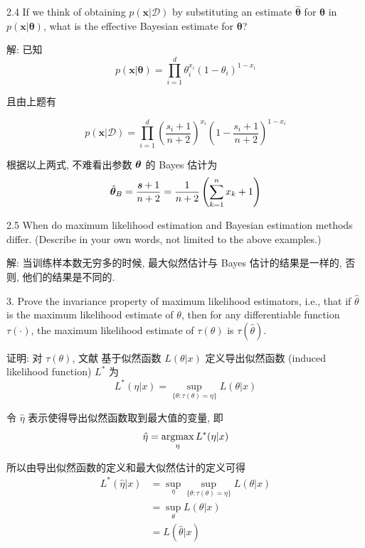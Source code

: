 \documentclass{article}
\begin{document}
2.4 If we think of obtaining $p(\bm{x}|\mathcal{D})$ by substituting an estimate $\hat{\bm{\theta}}$ for $\bm{\theta}$ in $p(\bm{x}|\bm{\theta})$,
what is the effective Bayesian estimate for $\bm{\theta}$?

解: 已知
\begin{equation}
  p(\bm{x}|\bm{\theta})
  =\prod_{i=1}^{d} \theta_{i}^{x_{i}}\left(1-\theta_{i}\right)^{1-x_{i}}
\end{equation}

且由上题有

\begin{equation}
  p(\bm{x}|\mathcal{D})=\prod_{i=1}^{d}\left(\frac{s_i+1}{n+2}\right)^{x_i}\left(1-\frac{s_i+1}{n+2}\right)^{1-x_i}
\end{equation}

根据以上两式, 不难看出参数 $\bm{\theta}$ 的 Bayes 估计为
\begin{equation}
  \hat{\bm{\theta}}_B=\frac{\bm{s}+1}{n+2}=\frac{1}{n+2}\left(\sum_{k=1}^nx_k+1\right)
\end{equation}

2.5 When do maximum likelihood estimation and Bayesian estimation methods differ. (Describe in your own words, not limited to the above examples.)

解: 当训练样本数无穷多的时候, 最大似然估计与 Bayes 估计的结果是一样的, 否则, 他们的结果是不同的.

3. Prove the invariance property of maximum likelihood estimators, i.e., that if $\hat{\theta}$ is the maximum likelihood estimate of $\theta$, then for any differentiable function $\tau(\cdot)$, the maximum likelihood estimate of $\tau(\theta)$ is $\tau(\hat{\theta})$.

证明: 对 $\tau(\theta)$, 文献 \cite{b1} 基于似然函数 $L(\theta|x)$ 定义导出似然函数 (induced likelihood function) $L^*$ 为
\begin{equation}
  L^*(\eta|x)=\sup_{\{\theta:\tau(\theta)=\eta\}}L(\theta|x)
\end{equation}

令 $\hat{\eta}$ 表示使得导出似然函数取到最大值的变量, 即
\begin{equation}
  \hat{\eta}=\operatorname*{argmax}_\eta L^*(\eta|x)
\end{equation}

所以由导出似然函数的定义和最大似然估计的定义可得
\begin{equation}
  \begin{aligned}
    L^*(\hat{\eta}|x)
    &=\sup_\eta\sup_{\{\theta:\tau(\theta)=\eta\}}L(\theta|x)\\
    &=\sup_\theta L(\theta|x)\\
    &=L(\hat{\theta}|x)\\
  \end{aligned}
\end{equation}
\end{document}
